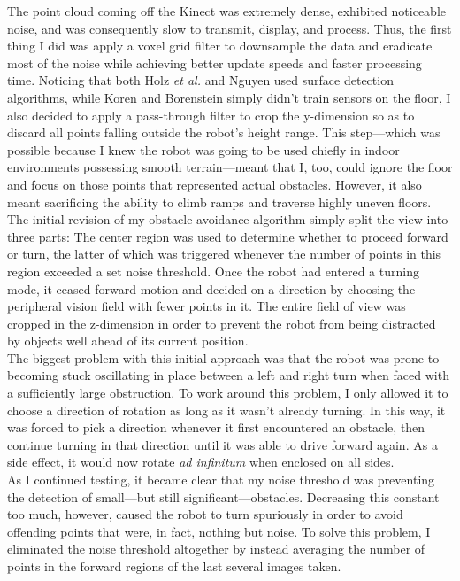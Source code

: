 \documentclass[12pt]{report}
\begin{document}
The point cloud coming off the Kinect was extremely dense, exhibited noticeable noise, and was consequently slow to transmit, display, and process.  Thus, the first thing I did was apply a voxel grid filter to downsample the data and eradicate most of the noise while achieving better update speeds and faster processing time.  Noticing that both Holz \textit{et al.} and Nguyen used surface detection algorithms, while Koren and Borenstein simply didn't train sensors on the floor, I also decided to apply a pass-through filter to crop the y-dimension so as to discard all points falling outside the robot's height range.  This step---which was possible because I knew the robot was going to be used chiefly in indoor environments possessing smooth terrain---meant that I, too, could ignore the floor and focus on those points that represented actual obstacles.  However, it also meant sacrificing the ability to climb ramps and traverse highly uneven floors. \\
The initial revision of my obstacle avoidance algorithm simply split the view into three parts:  The center region was used to determine whether to proceed forward or turn, the latter of which was triggered whenever the number of points in this region exceeded a set noise threshold.  Once the robot had entered a turning mode, it ceased forward motion and decided on a direction by choosing the peripheral vision field with fewer points in it.  The entire field of view was cropped in the z-dimension in order to prevent the robot from being distracted by objects well ahead of its current position. \\
The biggest problem with this initial approach was that the robot was prone to becoming stuck oscillating in place between a left and right turn when faced with a sufficiently large obstruction.  To work around this problem, I only allowed it to choose a direction of rotation as long as it wasn't already turning.  In this way, it was forced to pick a direction whenever it first encountered an obstacle, then continue turning in that direction until it was able to drive forward again.  As a side effect, it would now rotate \textit{ad infinitum} when enclosed on all sides. \\
As I continued testing, it became clear that my noise threshold was preventing the detection of small---but still significant---obstacles.  Decreasing this constant too much, however, caused the robot to turn spuriously in order to avoid offending points that were, in fact, nothing but noise.  To solve this problem, I eliminated the noise threshold altogether by instead averaging the number of points in the forward regions of the last several images taken. \\
\end{document}
